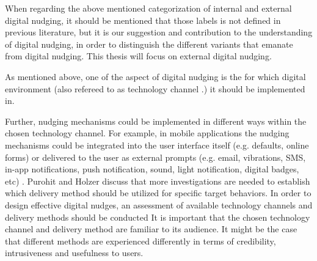 When regarding the above mentioned categorization of internal and external digital nudging, it should be mentioned that those labels is not defined in previous literature, but it is our suggestion and contribution to the understanding of digital nudging, in order to distinguish the different variants that emanate from digital nudging. This thesis will focus on external digital nudging. 

\bigbreak
\bigbreak
\bigbreak

 As mentioned above, one of the aspect of digital nudging is the for which digital environment (also refereed to as technology channel \cite{mirsch_making_2018}.) it should be implemented in. 
 
 
Further, nudging mechanisms could be implemented in different ways within the chosen technology channel. For example, in mobile applications the nudging mechanisms could be integrated into the user interface itself (e.g. defaults, online forms) or delivered to the user as external prompts (e.g. email, vibrations, SMS, in-app notifications, push notification, sound, light notification, digital badges, etc) \cite{purohit_functional_2019}.
Purohit and Holzer \cite{purohit_functional_2019}
discuss that more investigations are needed to establish which delivery method should be utilized for specific target behaviors. In order to design effective digital nudges, an assessment of available technology channels and delivery methods should be conducted\cite{mirsch_making_2018}
It is important that the chosen technology channel and delivery method are familiar to its audience. It might be the case that different methods are experienced differently in terms of credibility, intrusiveness and usefulness to users. %


